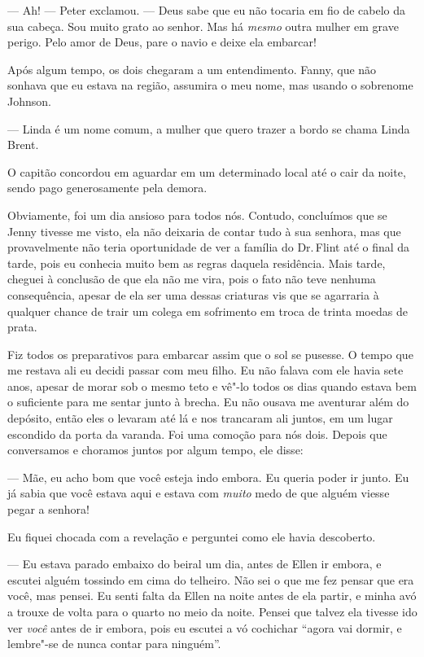--- Ah! --- Peter exclamou. --- Deus
sabe que eu não tocaria em fio de cabelo da sua cabeça. Sou muito grato
ao senhor. Mas há \emph{mesmo} outra mulher em grave perigo. Pelo amor
de Deus, pare o navio e deixe ela embarcar!

Após algum tempo, os dois chegaram a um
entendimento. Fanny, que não sonhava que eu estava na região, assumira o
meu nome, mas usando o sobrenome Johnson.

--- Linda é um nome comum, a mulher que quero trazer a bordo se chama
Linda Brent.

O capitão concordou em aguardar em um
determinado local até o cair da noite, sendo pago generosamente pela
demora.

Obviamente, foi um dia ansioso para
todos nós. Contudo, concluímos que se Jenny tivesse me visto, ela não
deixaria de contar tudo à sua senhora, mas que provavelmente não teria
oportunidade de ver a família do Dr.\,Flint até o final da tarde, pois eu
conhecia muito bem as regras daquela residência. Mais tarde, cheguei à
conclusão de que ela não me vira, pois o fato não teve nenhuma
consequência, apesar de ela ser uma dessas criaturas vis que se
agarraria à qualquer chance de trair um colega em sofrimento em troca de
trinta moedas de prata.

Fiz todos os preparativos para embarcar
assim que o sol se pusesse. O tempo que me restava ali eu decidi passar
com meu filho. Eu não falava com ele havia sete anos, apesar de morar
sob o mesmo teto e vê"-lo todos os dias quando estava bem o suficiente
para me sentar junto à brecha. Eu não ousava me aventurar além do
depósito, então eles o levaram até lá e nos trancaram ali juntos, em um
lugar escondido da porta da varanda. Foi uma comoção para nós dois.
Depois que conversamos e choramos juntos por algum tempo, ele disse:

--- Mãe, eu acho bom que você esteja indo embora. Eu queria poder ir
junto. Eu já sabia que você estava aqui e estava com \emph{muito} medo
de que alguém viesse pegar a senhora!

Eu fiquei chocada com a revelação e perguntei como ele havia descoberto.

--- Eu estava parado embaixo do beiral
um dia, antes de Ellen ir embora, e escutei alguém tossindo em cima do
telheiro. Não sei o que me fez pensar que era você, mas pensei. Eu senti
falta da Ellen na noite antes de ela partir, e minha avó a trouxe de
volta para o quarto no meio da noite. Pensei que talvez ela tivesse ido
ver \emph{você} antes de ir embora, pois eu escutei a vó cochichar
``agora vai dormir, e lembre"-se de nunca contar para ninguém''.

